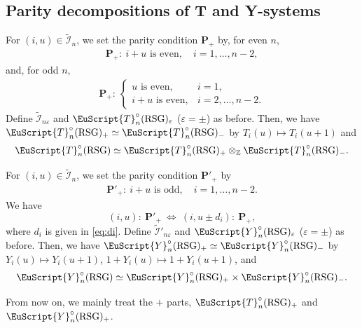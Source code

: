 \documentclass[pdftex]{sigma}
\numberwithin{equation}{section}
\theoremstyle{definition}
\begin{document}
\subsection{Parity decompositions of T and Y-systems}


For $(i,u)\in \tilde{\mathcal{I}}_{n}$,
we set the parity condition $\mathbf{P}_{+}$ by,
for even $n$,
\begin{gather*}
\mathbf{P}_{+}: \
\mbox{$i+u$ is even}, \quad i=1,\dots,n-2,
\end{gather*}
and, for odd $n$,
\begin{gather*}
\mathbf{P}_{+}: \
\begin{cases}
\mbox{$u$ is even},& i=1,\\
\mbox{$i+u$ is even},& i=2,\dots,n-2.
\end{cases}
\end{gather*}
Def\/ine
$\tilde{\mathcal{I}}_{n\varepsilon}$
and $\EuScript{T}^{\circ}_{n}(\mathrm{RSG})_{\varepsilon}$
($\varepsilon=\pm$)
as before.
Then, we have
$\EuScript{T}^{\circ}_{n}(\mathrm{RSG})_+
\simeq
\EuScript{T}^{\circ}_{n}(\mathrm{RSG})_-
$
by $T_i(u)\mapsto T_i(u+1)$ and
\begin{gather*}
\EuScript{T}^{\circ}_{n}(\mathrm{RSG})
\simeq
\EuScript{T}^{\circ}_{n}(\mathrm{RSG})_+
\otimes_{\mathbb{Z}}
\EuScript{T}^{\circ}_{n}(\mathrm{RSG})_-.
\end{gather*}

For  $(i,u)\in \tilde{\mathcal{I}}_{n}$,
we set the parity condition $\mathbf{P}'_{+}$ by
\begin{gather*}
\mathbf{P}'_{+}: \
\mbox{$i+u$ is odd},\quad i=1,\dots,n-2.
\end{gather*}
We have
\[
(i,u): \ \mathbf{P}'_+ \ \Longleftrightarrow\
\textstyle (i,u\pm d_i):\ \mathbf{P}_+,
\]
where $d_i$ is given in \eqref{eq:di}.
Def\/ine $\tilde{\mathcal{I}}'_{n\varepsilon}$
and $\EuScript{Y}^{\circ}_{n}(\mathrm{RSG})_{\varepsilon}$
($\varepsilon=\pm$) as before.
Then, we have
$\EuScript{Y}^{\circ}_{n}(\mathrm{RSG})_+
\simeq
\EuScript{Y}^{\circ}_{n}(\mathrm{RSG})_-
$
by $Y_i(u)\mapsto Y_i(u+1)$,
$1+Y_i(u)\mapsto 1+Y_i(u+1)$,
 and
\begin{gather*}
\EuScript{Y}^{\circ}_{n}(\mathrm{RSG})
\simeq
\EuScript{Y}^{\circ}_{n}(\mathrm{RSG})_+
\times
\EuScript{Y}^{\circ}_{n}(\mathrm{RSG})_-.
\end{gather*}

From now on, we mainly treat the $+$ parts,
$\EuScript{T}^{\circ}_{n}(\mathrm{RSG})_+$
and
$\EuScript{Y}^{\circ}_{n}(\mathrm{RSG})_+$.
\end{document}
